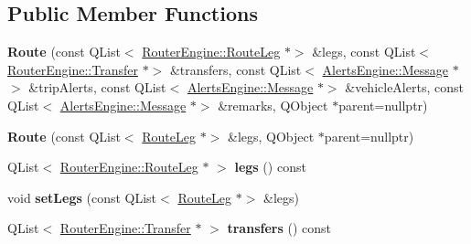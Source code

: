 \subsection*{Public Member Functions}
\begin{DoxyCompactItemize}
\item 
\mbox{\label{classRouterEngine_1_1Route_af55797a1f0895e2c361aa48c7b17a83c}} 
{\bfseries Route} (const Q\+List$<$ \mbox{\hyperlink{classRouterEngine_1_1RouteLeg}{Router\+Engine\+::\+Route\+Leg}} $\ast$$>$ \&legs, const Q\+List$<$ \mbox{\hyperlink{classRouterEngine_1_1Transfer}{Router\+Engine\+::\+Transfer}} $\ast$$>$ \&transfers, const Q\+List$<$ \mbox{\hyperlink{classAlertsEngine_1_1Message}{Alerts\+Engine\+::\+Message}} $\ast$$>$ \&trip\+Alerts, const Q\+List$<$ \mbox{\hyperlink{classAlertsEngine_1_1Message}{Alerts\+Engine\+::\+Message}} $\ast$$>$ \&vehicle\+Alerts, const Q\+List$<$ \mbox{\hyperlink{classAlertsEngine_1_1Message}{Alerts\+Engine\+::\+Message}} $\ast$$>$ \&remarks, Q\+Object $\ast$parent=nullptr)
\item 
\mbox{\label{classRouterEngine_1_1Route_a4b2d697502c5de4298cb8f6cfc14e22c}} 
{\bfseries Route} (const Q\+List$<$ \mbox{\hyperlink{classRouterEngine_1_1RouteLeg}{Route\+Leg}} $\ast$$>$ \&legs, Q\+Object $\ast$parent=nullptr)
\item 
\mbox{\label{classRouterEngine_1_1Route_a552677b912038bcaea9f2bf877cf05ce}} 
Q\+List$<$ \mbox{\hyperlink{classRouterEngine_1_1RouteLeg}{Router\+Engine\+::\+Route\+Leg}} $\ast$ $>$ {\bfseries legs} () const
\item 
\mbox{\label{classRouterEngine_1_1Route_ad51ae14971b6ce3ef88d79d088327b24}} 
void {\bfseries set\+Legs} (const Q\+List$<$ \mbox{\hyperlink{classRouterEngine_1_1RouteLeg}{Route\+Leg}} $\ast$$>$ \&legs)
\item 
\mbox{\label{classRouterEngine_1_1Route_a1bdf547bd8b4d36c1fa7073b8a66e3a0}} 
Q\+List$<$ \mbox{\hyperlink{classRouterEngine_1_1Transfer}{Router\+Engine\+::\+Transfer}} $\ast$ $>$ {\bfseries transfers} () const
\item 
\mbox{\label{classRouterEngine_1_1Route_a26d4b164819441f1df27b0ef7c237e9c}} 
$$
\end{DoxyCompactItemize}
